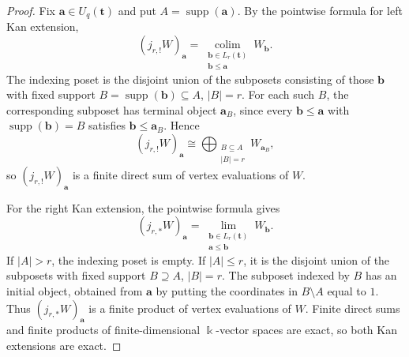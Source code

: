 \documentclass[10pt,a4paper]{amsart}
\begin{document}
\begin{proof}
Fix $\mathbf a\in U_q(\mathbf t)$ and put
$A=\operatorname{supp}(\mathbf a)$.  By the pointwise formula for left Kan
extension,
\[
(j_{r,!}W)_{\mathbf a}
=
\operatorname*{colim}_{\substack{\mathbf b\in L_r(\mathbf t)\\
\mathbf b\le\mathbf a}} W_{\mathbf b}.
\]
The indexing poset is the disjoint union of the subposets consisting of those
$\mathbf b$ with fixed support
$B=\operatorname{supp}(\mathbf b)\subseteq A$, $|B|=r$.  For each such $B$,
the corresponding subposet has terminal object $\mathbf a_B$, since every
$\mathbf b\le\mathbf a$ with $\operatorname{supp}(\mathbf b)=B$ satisfies
$\mathbf b\le\mathbf a_B$.  Hence
\[
(j_{r,!}W)_{\mathbf a}
\cong
\bigoplus_{\substack{B\subseteq A\\|B|=r}} W_{\mathbf a_B},
\]
so $(j_{r,!}W)_{\mathbf a}$ is a finite direct sum of vertex evaluations of
$W$.

For the right Kan extension, the pointwise formula gives
\[
(j_{r,*}W)_{\mathbf a}
=
\operatorname*{lim}_{\substack{\mathbf b\in L_r(\mathbf t)\\
\mathbf a\le\mathbf b}} W_{\mathbf b}.
\]
If $|A|>r$, the indexing poset is empty.  If $|A|\le r$, it is the disjoint
union of the subposets with fixed support $B\supseteq A$, $|B|=r$.  The
subposet indexed by $B$ has an initial object, obtained from $\mathbf a$ by
putting the coordinates in $B\setminus A$ equal to $1$.  Thus
$(j_{r,*}W)_{\mathbf a}$ is a finite product of vertex evaluations of $W$.
Finite direct sums and finite products of finite-dimensional $\Bbbk$-vector spaces
are exact, so both Kan extensions are exact.
\end{proof}
\end{document}
